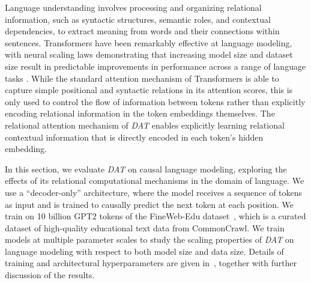 Language understanding involves processing and organizing relational information, such as syntactic structures, semantic roles, and contextual dependencies, to extract meaning from words and their connections within sentences. Transformers have been remarkably effective at language modeling, with neural scaling laws demonstrating that increasing model size and dataset size result in predictable improvements in performance across a range of language tasks \citep{kaplan2020scalinglawsneurallanguage}. While the standard attention mechanism of Transformers is able to capture simple positional and syntactic relations in its attention scores, this is only used to control the flow of information between tokens rather than explicitly encoding relational information in the token embeddings themselves. The relational attention mechanism of \textit{DAT} enables explicitly learning relational contextual information that is directly encoded in each token's hidden embedding.

In this section, we evaluate \textit{DAT} on causal language modeling, exploring the effects of its relational computational mechanisms in the domain of language. We use a ``decoder-only'' architecture, where the model receives a sequence of tokens as input and is trained to causally predict the next token at each position. We train on 10 billion GPT2 tokens of the FineWeb-Edu dataset~\citep{lozhkov2024fineweb-edu}, which is a curated dataset of high-quality educational text data from CommonCrawl. We train models at multiple parameter scales to study the scaling properties of \textit{DAT} on language modeling with respect to both model size and data size. Details of training and architectural hyperparameters are given in~, together with further discussion of the results.

%     

%     

